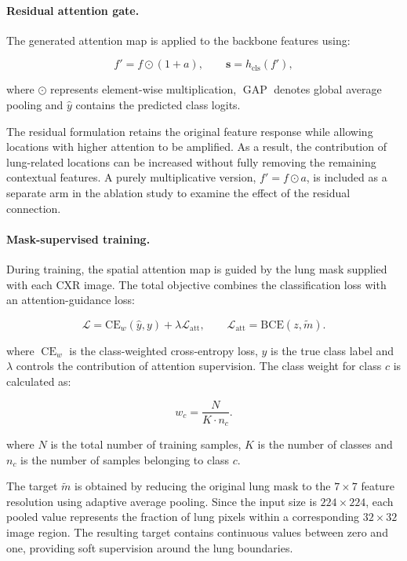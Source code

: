 \documentclass[sigconf,screen,nonacm]{acmart}
\begin{document}
\paragraph{Residual attention gate.}
The generated attention map is applied to the backbone features using:

\begin{equation}
f' = f \odot (1+a),
\qquad
\mathbf{s}=h_{\mathrm{cls}}(f'),
\end{equation}

where $\odot$ represents element-wise multiplication, $\operatorname{GAP}$ denotes global average pooling and $\hat{y}$ contains the predicted class logits.

The residual formulation retains the original feature response while allowing locations with higher attention to be amplified. As a result, the contribution of lung-related locations can be increased without fully removing the remaining contextual features. A purely multiplicative version, $f'=f\odot a$, is included as a separate arm in the ablation study to examine the effect of the residual connection.

\paragraph{Mask-supervised training.}
During training, the spatial attention map is guided by the lung mask supplied with each CXR image. The total objective combines the classification loss with an attention-guidance loss:

\begin{equation}
\mathcal{L}
=
\mathrm{CE}_{w}(\hat{y},y)
+
\lambda\mathcal{L}_{\mathrm{att}},
\qquad
\mathcal{L}_{\mathrm{att}}
=
\mathrm{BCE}(z,\tilde{m}).
\end{equation}

where $\operatorname{CE}_{w}$ is the class-weighted cross-entropy loss, $y$ is the true class label and $\lambda$ controls the contribution of attention supervision. The class weight for class $c$ is calculated as:

\begin{equation}
w_c = \frac{N}{K\cdot n_c}.
\end{equation}

where $N$ is the total number of training samples, $K$ is the number of classes and $n_c$ is the number of samples belonging to class $c$.

The target $\tilde{m}$ is obtained by reducing the original lung mask to the $7\times7$ feature resolution using adaptive average pooling. Since the input size is $224\times224$, each pooled value represents the fraction of lung pixels within a corresponding $32\times32$ image region. The resulting target contains continuous values between zero and one, providing soft supervision around the lung boundaries.
\end{document}
